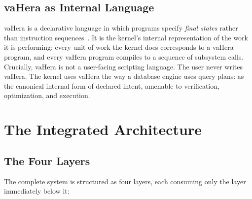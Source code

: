 \documentclass[11pt,twocolumn,a4paper]{article}
\begin{document}
\subsection{vaHera as Internal Language}

vaHera is a declarative language in which programs specify \emph{final states} rather than instruction sequences~\cite{pierce2002types,moggi1991notions}. It is the kernel's internal representation of the work it is performing: every unit of work the kernel does corresponds to a vaHera program, and every vaHera program compiles to a sequence of subsystem calls. Crucially, vaHera is not a user-facing scripting language. The user never writes vaHera. The kernel uses vaHera the way a database engine uses query plans: as the canonical internal form of declared intent, amenable to verification, optimization, and execution.


\section{The Integrated Architecture}
\label{sec:architecture}

\subsection{The Four Layers}

The complete system is structured as four layers, each consuming only the layer immediately below it:

\begin{center}
\end{center}
\end{document}

